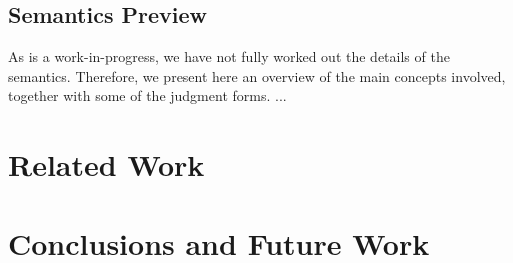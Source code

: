 \documentclass{entcs}
\begin{document}
\subsection{Semantics Preview}

As \datatype{} is a work-in-progress, we have not fully worked out the
details of the semantics.  Therefore, we present here an overview of
the main concepts involved, together with some of the judgment forms.
...



\section{Related Work}
\label{sec:related-work}

\section{Conclusions and Future Work}
\label{sec:conclusion}
\end{document}
